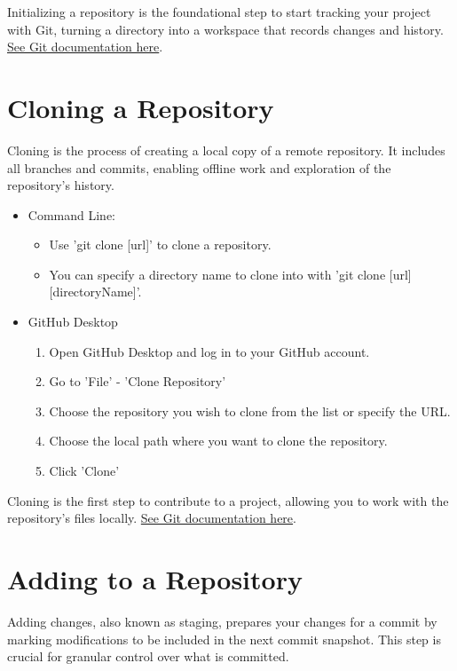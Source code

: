 \documentclass[10pt,twocolumn]{article}
\begin{document}
Initializing a repository is the foundational step to start tracking your project with Git, turning a directory into a workspace that records changes and history. \hyperlink{https://git-scm.com/docs/git-init}{See Git documentation here}. \cite{GitInitDocumentation}\cite{GitGuidesInit}

\section{Cloning a Repository}

Cloning is the process of creating a local copy of a remote repository. It includes all branches and commits, enabling offline work and exploration of the repository's history.

\begin{itemize}
    \item Command Line: 
    \begin{itemize}
        \item Use 'git clone [url]' to clone a repository. 
        \item You can specify a directory name to clone into with 'git clone [url] [directoryName]'.
    \end{itemize}
    \item GitHub Desktop
    \begin{enumerate}
        \item Open GitHub Desktop and log in to your GitHub account.
        \item Go to 'File' - 'Clone Repository'
        \item Choose the repository you wish to clone from the list or specify the URL.
        \item Choose the local path where you want to clone the repository.
        \item Click 'Clone'
    \end{enumerate}
    
\end{itemize}

Cloning is the first step to contribute to a project, allowing you to work with the repository's files locally. \hyperlink{https://git-scm.com/docs/git-clone}{See Git documentation here}. \cite{GitCloneDocumentation}\cite{GitGuidesClone}

\section{Adding to a Repository}
Adding changes, also known as staging, prepares your changes for a commit by marking modifications to be included in the next commit snapshot. This step is crucial for granular control over what is committed.
\end{document}
